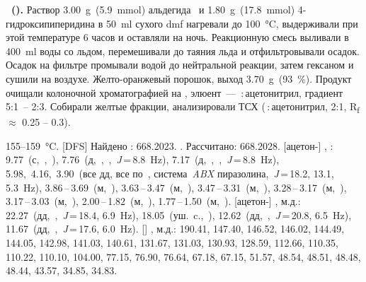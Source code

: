 \textbf{~().}
Раствор \SI{3.00}{\gram}~(\SI{5.9}{\mmol}) альдегида~ и \SI{1.80}{\gram}~(\SI{17.8}{\mmol}) 4-гидроксипиперидина в \SI{50}{\milli\litre} сухого \ac{dmf} нагревали до \SI{100}{\celsius}, выдерживали при этой температуре 6 часов и оставляли на ночь.
Реакционную смесь выливали в \SI{400}{\milli\litre} воды со льдом, перемешивали до таяния льда и отфильтровывали осадок.
Осадок на фильтре промывали водой до нейтральной реакции, затем гексаном и сушили на воздухе.
Желто-оранжевый порошок, выход \SI{3.70}{\gram}~(\SI{93}{\percent}).
Продукт очищали колоночной хроматографией на , элюент~--- \,:\,ацетонитрил, градиент 5:1~-- 2:3. Собирали желтые фракции, анализировали ТСХ (\,:\,ацетонитрил, 2:1, R\textsubscript{f} $\approx$ 0.25 -- 0.3).
\begin{experimental}[]
     155--\SI{159}{\celsius}.
    [DFS] Найдено \ce{[M+]}: \num{668.2023}. . Рассчитано:  \num{668.2028}.
    [ацетон-] \chemdelta, \si{\ppm}: 9.77~(с,~,~), 7.76~(д,~,~,~\textit{J}\,=\,8.8~\si{\hertz}), 7.17~(д,~,~,~\textit{J}\,=\,8.8~\si{\hertz}), 5.98,~4.16,~3.90~(все дд, все по~, система~\emph{ABX} пиразолина,~\textit{J}\,=\,18.2, 13.1, 5.3~\si{\hertz}), 3.86\,--\,3.69~(м,~), 3.63\,--\,3.47~(м,~), 3.47\,--\,3.31~(м,~), 3.28\,--\,3.17~(м,~), 3.17\,--\,3.03~(м,~), 2.00\,--\,1.82~(м,~), 1.77\,--\,1.50~(м,~).
    [ацетон-] \chemdelta, м.д.: 22.27~(дд,~,~\textit{J}\,=\,18.4, 6.9~\si{\hertz}), 18.05~(уш.~c.,~), 12.62~(дд,~,~\textit{J}\,=\,20.8, 6.5~\si{\hertz}), 11.67~(дд,~,~\textit{J}\,=\,17.6, 6.0~\si{\hertz}).
    [] \chemdelta, м.д.: 190.41, 147.40, 146.52, 146.02, 144.49, 144.05, 142.98, 141.03, 140.61, 131.67, 131.03, 130.93, 128.59, 112.66, 110.35, 110.22, 110.10, 104.00, 77.15, 76.90, 76.64, 67.18, 67.15, 51.57, 48.54, 48.51, 48.48, 48.44, 43.57, 34.85, 34.83.
\end{experimental}


